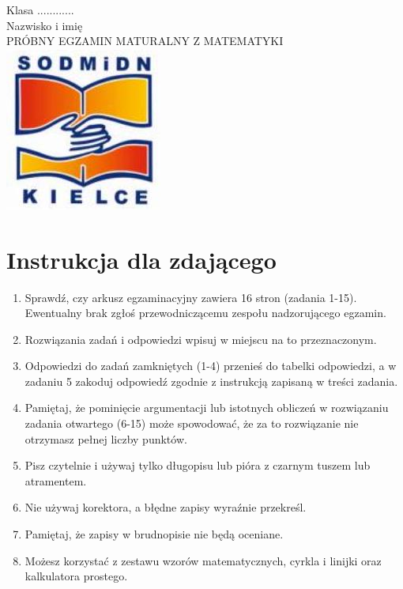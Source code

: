 \documentclass[10pt]{article}
\begin{document}
Klasa ............\\
Nazwisko i imię\\
PRÓBNY EGZAMIN MATURALNY Z MATEMATYKI\\
\includegraphics[max width=\textwidth, center]{2024_11_21_49bfa1d51da2e7fce9c5g-01}

\section*{Instrukcja dla zdającego}
\begin{enumerate}
  \item Sprawdź, czy arkusz egzaminacyjny zawiera 16 stron (zadania 1-15).\\
Ewentualny brak zgłoś przewodniczącemu zespołu nadzorującego egzamin.
  \item Rozwiązania zadań i odpowiedzi wpisuj w miejscu na to przeznaczonym.
  \item Odpowiedzi do zadań zamkniętych (1-4) przenieś do tabelki odpowiedzi, a w zadaniu 5 zakoduj odpowiedź zgodnie z instrukcją zapisaną w treści zadania.
  \item Pamiętaj, że pominięcie argumentacji lub istotnych obliczeń w rozwiązaniu zadania otwartego (6-15) może spowodować, że za to rozwiązanie nie otrzymasz pełnej liczby punktów.
  \item Pisz czytelnie i używaj tylko długopisu lub pióra z czarnym tuszem lub atramentem.
  \item Nie używaj korektora, a błędne zapisy wyraźnie przekreśl.
  \item Pamiętaj, że zapisy w brudnopisie nie będą oceniane.
  \item Możesz korzystać z zestawu wzorów matematycznych, cyrkla i linijki oraz kalkulatora prostego.
\end{enumerate}
\end{document}
